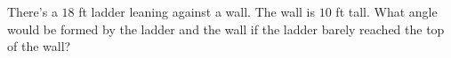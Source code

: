 There's a $18$ ft ladder leaning against a wall. The wall is $10$ ft tall. What angle would be formed by the ladder and the wall if the ladder barely reached the top of the wall?
